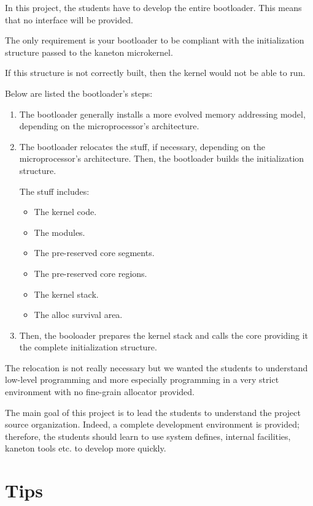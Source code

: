 In this project, the students have to develop the entire bootloader.
This means that no interface will be provided.

The only requirement is your bootloader to be compliant with the
initialization structure passed to the kaneton microkernel.

If this structure is not correctly built, then the kernel would not
be able to run.

Below are listed the bootloader's steps:

\begin{enumerate}
  \item
    The bootloader generally installs a more evolved memory addressing model,
    depending on the microprocessor's architecture.
  \item
    The bootloader relocates the stuff, if necessary, depending on the
    microprocessor's architecture. Then, the bootloader builds the
    initialization structure.

    The stuff includes:

    \begin{itemize}
      \item
	The kernel code.
      \item
	The modules.
      \item
	The pre-reserved core segments.
      \item
	The pre-reserved core regions.
      \item
	The kernel stack.
      \item
	The alloc survival area.
    \end{itemize}
  \item
    Then, the booloader prepares the kernel stack and calls the core
    providing it the complete initialization structure.
\end{enumerate}

The relocation is not really necessary but we wanted the students
to understand low-level programming and more especially programming
in a very strict environment with no fine-grain allocator provided.

The main goal of this project is to lead the students to understand the
project source organization. Indeed, a complete development environment
is provided; therefore, the students should learn to use system defines,
internal facilities, kaneton tools etc. to develop more quickly.

%
%

\section{Tips}

